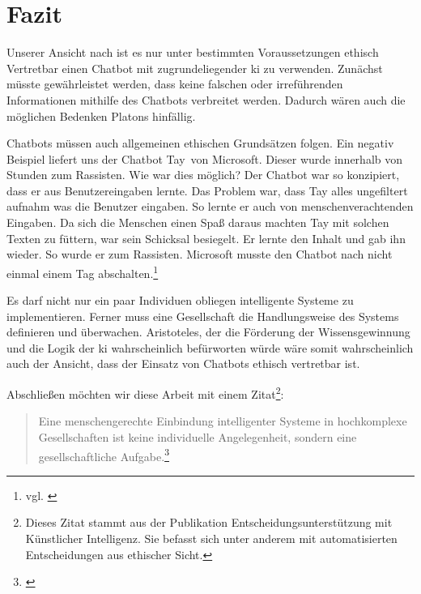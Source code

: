 \section{Fazit}
Unserer Ansicht nach ist es nur unter bestimmten Voraussetzungen ethisch Vertretbar einen Chatbot mit zugrundeliegender \ac{ki} zu verwenden.
Zunächst müsste gewährleistet werden, dass keine falschen oder irreführenden Informationen mithilfe des Chatbots verbreitet werden. Dadurch wären auch die möglichen Bedenken Platons hinfällig. 

Chatbots müssen auch allgemeinen ethischen Grundsätzen folgen. Ein negativ Beispiel liefert uns der Chatbot \glqq Tay\grqq\ von Microsoft. Dieser wurde innerhalb von Stunden zum Rassisten. Wie war dies möglich? Der Chatbot war so konzipiert, dass er aus Benutzereingaben lernte. Das Problem war, dass Tay alles ungefiltert aufnahm was die Benutzer eingaben. So lernte er auch von menschenverachtenden Eingaben. Da sich die Menschen einen Spaß daraus machten Tay mit solchen Texten zu \glqq füttern\grqq, war sein Schicksal besiegelt. Er lernte den Inhalt und gab ihn wieder. So wurde er zum Rassisten. Microsoft musste den Chatbot nach nicht einmal einem Tag abschalten.\footnote{vgl. \cite{TaySpiegel}} 

Es darf nicht nur ein paar Individuen obliegen intelligente Systeme zu implementieren. Ferner muss eine Gesellschaft die Handlungsweise des Systems definieren und überwachen. 
Aristoteles, der die Förderung der Wissensgewinnung und die Logik der \ac{ki} wahrscheinlich befürworten würde wäre somit wahrscheinlich auch der Ansicht, dass der Einsatz von Chatbots ethisch vertretbar ist.

Abschließen möchten wir diese Arbeit mit einem Zitat\footnote{Dieses Zitat stammt aus der Publikation \glqq Entscheidungsunterstützung mit Künstlicher Intelligenz\grqq. Sie befasst sich unter anderem mit automatisierten Entscheidungen aus ethischer Sicht.}:
\begin{quote}
	 \glqq Eine menschengerechte Einbindung intelligenter Systeme in hochkomplexe Gesellschaften ist keine individuelle Angelegenheit, sondern eine gesellschaftliche Aufgabe.\grqq\footnote{\cite{BitkomZitat}}
\end{quote}
